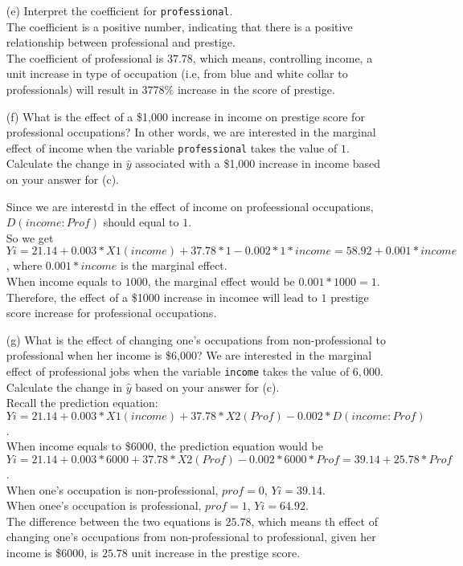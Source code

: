 \documentclass[12pt,letterpaper]{article}
\begin{document}
\begin{enumerate}
	\item [(e)]
	Interpret the coefficient for \texttt{professional}.\\
	\vspace{.5cm}
	The coefficient is a positive number, indicating that there is a positive relationship between professional and prestige. \\
	The coefficient of professional is $37.78$, which means, controlling income, a unit increase in type of occupation (i.e, from blue and white collar to professionals) will result in $3778\%$ increase in the score of prestige.
	
	\newpage
	\item [(f)]
	What is the effect of a \$1,000 increase in income on prestige score for professional occupations? In other words, we are interested in the marginal effect of income when the variable \texttt{professional} takes the value of $1$. Calculate the change in $\hat{y}$ associated with a \$1,000 increase in income based on your answer for (c).
	
	\vspace{.5cm}
	Since we are interestd in the effect of income on profeessional occupations, $D(income:Prof)$ should equal to $1$.\\
	So we get $Yi= 21.14 + 0.003*X1(income) + 37.78*1 - 0.002*1*income = 58.92 + 0.001*income$, where $0.001*income$ is the marginal effect.\\
	When income equals to $1000$, the marginal effect would be $0.001*1000 = 1$.
	Therefore, the effect of a \$1000 increase in incomee will lead to $1$ prestige score increase for professional occupations.\\
	
	
	\item [(g)]
	What is the effect of changing one's occupations from non-professional to professional when her income is \$6,000? We are interested in the marginal effect of professional jobs when the variable \texttt{income} takes the value of $6,000$. Calculate the change in $\hat{y}$ based on your answer for (c).\\
	
	Recall the prediction equation: $Yi= 21.14 + 0.003*X1(income) + 37.78*X2(Prof) - 0.002*D(income:Prof)$.\\
	When income equals to \$6000, the prediction equation would be $Yi= 21.14 + 0.003*6000 + 37.78*X2(Prof) - 0.002*6000*Prof = 39.14 + 25.78*Prof$.\\
	When one's occupation is non-professional, $prof = 0$, $Yi =39.14$.\\ 
	When onee's occupation is professional, $prof = 1$, $Yi = 64.92$.\\
	The difference between the two equations is $25.78$, which means th effect of changing one's occupations from non-professional to professional, given her income is \$6000, is $25.78$ unit increase in the prestige score.
	
	
	
\end{enumerate}
\end{document}
